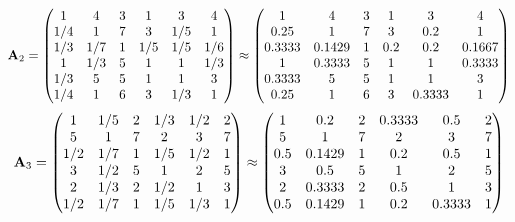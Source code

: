 \documentclass[10pt,a4paper]{article}
\begin{document}
	\[
		\bold{A}_{2} = 
		\begin{pmatrix}
			{1}{} & {{4}}{} & {{3}}{} & {1}{} & {{3}}{} & {{4}}{} \\
			{1} / {{4}} & {1}{} & {{7}}{} & {{3}}{} & {1} / {{5}} & {1}{} \\
			{1} / {{3}} & {1} / {{7}} & {1}{} & {1} / {{5}} & {1} / {{5}} & {1} / {{6}} \\
			{1}{} & {1} / {{3}} & {{5}}{} & {1}{} & {1}{} & {1} / {{3}} \\
			{1} / {{3}} & {{5}}{} & {{5}}{} & {1}{} & {1}{} & {{3}}{} \\
			{1} / {{4}} & {1}{} & {{6}}{} & {{3}}{} & {1} / {{3}} & {1}{} \\
		\end{pmatrix}
		\approx
		\begin{pmatrix}
			1        & 4        & 3        & 1        & 3        & 4        \\
			0.25     & 1        & 7        & 3        & 0.2      & 1        \\
			0.3333   & 0.1429   & 1        & 0.2      & 0.2      & 0.1667   \\
			1        & 0.3333   & 5        & 1        & 1        & 0.3333   \\
			0.3333   & 5        & 5        & 1        & 1        & 3        \\
			0.25     & 1        & 6        & 3        & 0.3333   & 1        \\
		\end{pmatrix}
	\]
	\[
		\bold{A}_{3} = 
		\begin{pmatrix}
			{1}{} & {1} / {{5}} & {{2}}{} & {1} / {{3}} & {1} / {{2}} & {{2}}{} \\
			{{5}}{} & {1}{} & {{7}}{} & {{2}}{} & {{3}}{} & {{7}}{} \\
			{1} / {{2}} & {1} / {{7}} & {1}{} & {1} / {{5}} & {1} / {{2}} & {1}{} \\
			{{3}}{} & {1} / {{2}} & {{5}}{} & {1}{} & {{2}}{} & {{5}}{} \\
			{{2}}{} & {1} / {{3}} & {{2}}{} & {1} / {{2}} & {1}{} & {{3}}{} \\
			{1} / {{2}} & {1} / {{7}} & {1}{} & {1} / {{5}} & {1} / {{3}} & {1}{} \\
		\end{pmatrix}
		\approx
		\begin{pmatrix}
			1        & 0.2      & 2        & 0.3333   & 0.5      & 2        \\
			5        & 1        & 7        & 2        & 3        & 7        \\
			0.5      & 0.1429   & 1        & 0.2      & 0.5      & 1        \\
			3        & 0.5      & 5        & 1        & 2        & 5        \\
			2        & 0.3333   & 2        & 0.5      & 1        & 3        \\
			0.5      & 0.1429   & 1        & 0.2      & 0.3333   & 1        \\
		\end{pmatrix}
	\]
\end{document}
